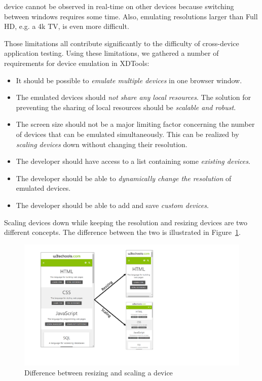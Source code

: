 device cannot be observed in real-time on other devices because switching between windows requires some time. Also, emulating resolutions larger than Full HD, e.g. a 4k TV, is even more difficult.

Those limitations all contribute significantly to the difficulty of cross-device application testing. Using these limitations, we gathered a number of requirements for device emulation in XDTools:
\begin{itemize}
	\item It should be possible to \emph{emulate multiple devices} in one browser window.
	\item The emulated devices should \emph{not share any local resources}. The solution for preventing the sharing of local resources should be \emph{scalable and robust}.
	\item The screen size should not be a major limiting factor concerning the number of devices that can be emulated simultaneously. This can be realized by \emph{scaling devices} down without changing their resolution.
	\item The developer should have access to a list containing some \emph{existing devices}.
	\item The developer should be able to \emph{dynamically change the resolution} of emulated devices.
	\item The developer should be able to add and save \emph{custom devices}.
\end{itemize}

Scaling devices down while keeping the resolution and resizing devices are two different concepts. The difference between the two is illustrated in Figure~\ref{fig:difference_resizing_scaling}.

\begin{figure}[H]
  \centering
    \includegraphics[width=1.0\textwidth]{images/difference_scaling_resizing.pdf}
	\caption[Difference between resizing and scaling a device]{Difference between resizing and scaling a device}
	\label{fig:difference_resizing_scaling}
\end{figure}

